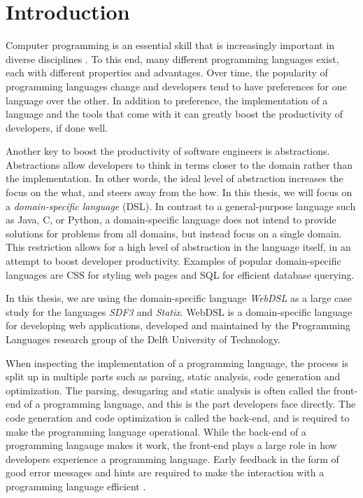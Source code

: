 
\chapter{\label{chap:introduction}Introduction}

  Computer programming is an essential skill that is increasingly important in diverse disciplines \autocite{Rafalski2019}. To this end, many different programming languages exist, each with different properties and advantages. Over time, the popularity of programming languages change and developers tend to have preferences for one language over the other. In addition to preference, the implementation of a language and the tools that come with it can greatly boost the productivity of developers, if done well.

  Another key to boost the productivity of software engineers is abstractions. Abstractions allow developers to think in terms closer to the domain rather than the implementation. In other words, the ideal level of abstraction increases the focus on the what, and steers away from the how. In this thesis, we will focus on a \textit{domain-specific language} (DSL). In contrast to a general-purpose language such as Java, C, or Python, a domain-specific language does not intend to provide solutions for problems from all domains, but instead focus on a single domain. This restriction allows for a high level of abstraction in the language itself, in an attempt to boost developer productivity. Examples of popular domain-specific languages are CSS for styling web pages and SQL for efficient database querying.

  In this thesis, we are using the domain-specific language \textit{WebDSL} as a large case study for the languages \textit{SDF3} and \textit{Statix}. WebDSL is a domain-specific language for developing web applications, developed and maintained by the Programming Languages research group of the Delft University of Technology.

  When inspecting the implementation of a programming language, the process is split up in multiple parts such as parsing, static analysis, code generation and optimization. The parsing, desugaring and static analysis is often called the front-end of a programming language, and this is the part developers face directly. The code generation and code optimization is called the back-end, and is required to make the programming language operational. While the back-end of a programming langauge makes it work, the front-end plays a large role in how developers experience a programming language. Early feedback in the form of good error messages and hints are required to make the interaction with a programming language efficient \autocite{Becker2019}.

